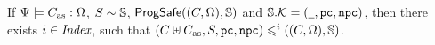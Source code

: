 \begin{lemma}
    \label{lemma:function sim implies whole program sim}
    If ${\Psi} \models {C_{\text{as}}} : {\Omega}$,
    ${S} \sim {\mathbb{S}}$,
    {\em $\textsf{ProgSafe}((C, \Omega), \mathbb{S})$} and
    {\em $\mathbb{S}.\mathcal{K} = (\underline{\ \,}, \texttt{pc}, \texttt{npc})$},
    then there exists $i \in \textit{Index}$, such that  
    {\em $(C\uplus C_{\text{as}}, S, \texttt{pc}, \texttt{npc})
        \leqslant^{i} ((C, \Omega), \mathbb{S})$}.
\end{lemma}
%                 

